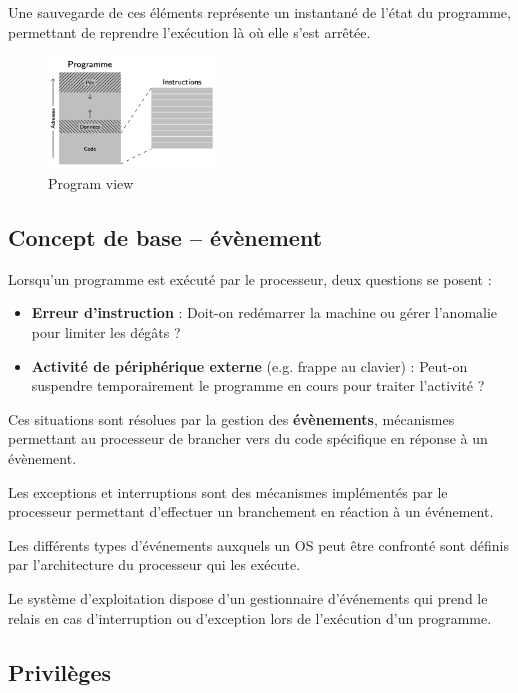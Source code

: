 Une sauvegarde de ces éléments représente un instantané de l'état du programme, permettant de reprendre l'exécution là où elle s'est arrêtée.

\begin{figure}[h]
    \centering
    \includegraphics[width=0.4\textwidth]{Images/View/program-view.png}
    \caption{Program view}
\end{figure}

\subsection{Concept de base – évènement}

Lorsqu’un programme est exécuté par le processeur, deux questions se posent :
\begin{itemize}
    \item \textbf{Erreur d'instruction} : Doit-on redémarrer la machine ou gérer l’anomalie pour limiter les dégâts ?
    \item \textbf{Activité de périphérique externe} (e.g. frappe au clavier) : Peut-on suspendre temporairement le programme en cours pour traiter l’activité ?
\end{itemize}

Ces situations sont résolues par la gestion des \textbf{évènements}, mécanismes permettant au processeur de brancher vers du code spécifique en réponse à un évènement.

Les exceptions et interruptions sont des mécanismes implémentés par le processeur permettant d'effectuer un branchement en réaction à un événement.

Les différents types d'événements auxquels un OS peut être confronté sont définis par l'architecture du processeur qui les exécute.

Le système d'exploitation dispose d'un gestionnaire d'événements qui prend le relais en cas d'interruption ou d'exception lors de l'exécution d'un programme.

\subsection{Privilèges}

